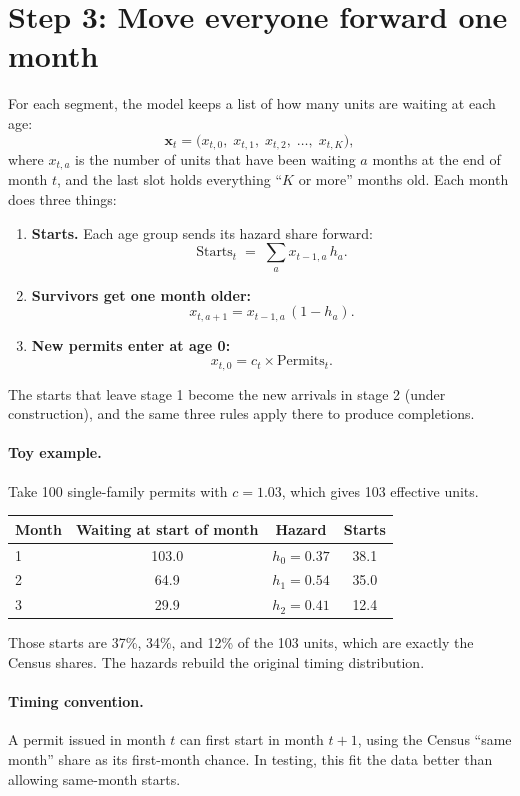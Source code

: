 \documentclass[11pt]{article}
\begin{document}
\section{Step 3: Move everyone forward one month}

For each segment, the model keeps a list of how many units are waiting at each
age:
\[
  \mathbf{x}_t = \bigl(x_{t,0},\; x_{t,1},\; x_{t,2},\; \dots,\; x_{t,K}\bigr),
\]
where $x_{t,a}$ is the number of units that have been waiting $a$ months at
the end of month $t$, and the last slot holds everything ``$K$ or more''
months old. Each month does three things:

\begin{enumerate}
  \item \textbf{Starts.} Each age group sends its hazard share forward:
  \[
    \text{Starts}_t \;=\; \sum_{a} x_{t-1,a}\, h_a .
  \]
  \item \textbf{Survivors get one month older:}
  \[
    x_{t,a+1} = x_{t-1,a}\,(1-h_a).
  \]
  \item \textbf{New permits enter at age 0:}
  \[
    x_{t,0} = c_t \times \text{Permits}_t .
  \]
\end{enumerate}

The starts that leave stage 1 become the new arrivals in stage 2 (under
construction), and the same three rules apply there to produce completions.

\paragraph{Toy example.} Take 100 single-family permits with $c=1.03$, which
gives 103 effective units.
\begin{center}
\begin{tabular}{lccc}
\toprule
Month & Waiting at start of month & Hazard & Starts \\
\midrule
1 & 103.0 & $h_0 = 0.37$ & 38.1 \\
2 & 64.9  & $h_1 = 0.54$ & 35.0 \\
3 & 29.9  & $h_2 = 0.41$ & 12.4 \\
\bottomrule
\end{tabular}
\end{center}
Those starts are 37\%, 34\%, and 12\% of the 103 units, which are exactly
the Census shares. The hazards rebuild the original timing distribution.

\paragraph{Timing convention.} A permit issued in month $t$ can first start
in month $t+1$, using the Census ``same month'' share as its first-month
chance. In testing, this fit the data better than allowing same-month starts.
\end{document}
